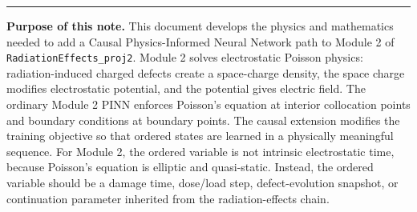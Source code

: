 \documentclass[11pt]{article}
\begin{document}

\hrule
\vspace{0.8em}

\begin{overviewbox}
\textbf{Purpose of this note.} This document develops the physics and mathematics needed to add a Causal Physics-Informed Neural Network path to Module 2 of \texttt{RadiationEffects\_proj2}. Module 2 solves electrostatic Poisson physics: radiation-induced charged defects create a space-charge density, the space charge modifies electrostatic potential, and the potential gives electric field. The ordinary Module 2 PINN enforces Poisson's equation at interior collocation points and boundary conditions at boundary points. The causal extension modifies the training objective so that ordered states are learned in a physically meaningful sequence. For Module 2, the ordered variable is not intrinsic electrostatic time, because Poisson's equation is elliptic and quasi-static. Instead, the ordered variable should be a damage time, dose/load step, defect-evolution snapshot, or continuation parameter inherited from the radiation-effects chain.
\end{overviewbox}

\ProjectTOC

\SymbolsAcronymsSection
\end{document}
